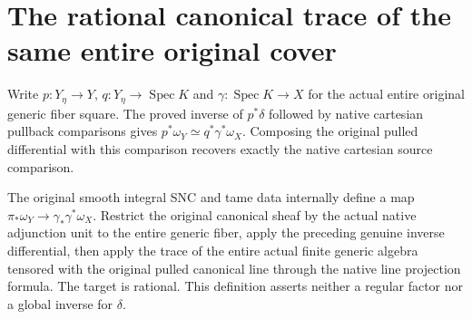 \section{The rational canonical trace of the same entire original cover}

\begin{definition}
\label{def:kn-canonical-original-generic-comparison}
\leanok
Write $p:Y_\eta\to Y$, $q:Y_\eta\to\operatorname{Spec}K$ and
$\gamma:\operatorname{Spec}K\to X$ for the actual entire original
generic fiber square. The proved inverse of $p^*\delta$ followed by
native cartesian pullback comparisons gives
$p^*\omega_Y\simeq q^*\gamma^*\omega_X$. Composing the original
pulled differential with this comparison recovers exactly the native
cartesian source comparison.
\end{definition}

\begin{definition}
\label{def:kn-canonical-original-rational-trace}
\leanok
The original smooth integral SNC and tame data internally define a map
$\pi_*\omega_Y\to\gamma_*\gamma^*\omega_X$. Restrict the original
canonical sheaf by the actual native adjunction unit to the entire
generic fiber, apply the preceding genuine inverse differential, then
apply the trace of the entire actual finite generic algebra tensored
with the original pulled canonical line through the native line
projection formula. The target is rational. This definition asserts
neither a regular factor nor a global inverse for $\delta$.
\end{definition}
